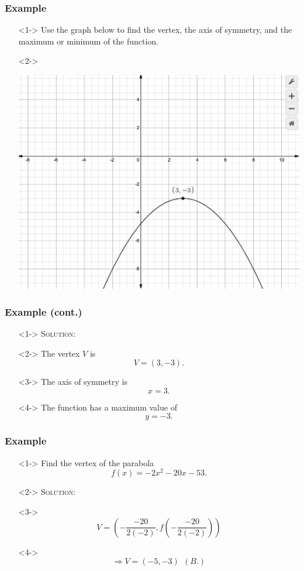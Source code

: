 \documentclass[handout]{beamer}
\begin{document}
\begin{frame}
	\frametitle{Example} 
	\begin{enumerate}
		\item[]<1-> Use the graph below to find the vertex, the axis of symmetry, and the maximum or minimum of the function. 
		\item[]<2-> 
			\begin{center}
				\includegraphics[scale=0.2]{3_3_10.png} 
			\end{center} 
	\end{enumerate}
\end{frame}

\begin{frame}
	\frametitle{Example (cont.)} 
	\begin{enumerate}
		\item[]<1-> \textsc{Solution:} 
		\item[]<2-> The vertex $V$ is 
			\[
				V=(3,-3). 
			\]
		\item[]<3-> The axis of symmetry is 
		\[
			x=3. 
		\]
		\item[]<4-> The function has a maximum value of 
		\[
			y=-3.  
		\]
	\end{enumerate}
\end{frame}

\begin{frame}
	\frametitle{Example}
	\begin{enumerate}
		\item[]<1-> Find the vertex of the parabola 
			\[
				f(x)=-2x^{2}-20x-53. 
			\]
		\item[]<2-> \textsc{Solution:} 
		\item[]<3-> \[ V= \left( -\frac{-20}{2(-2)}, f \left( -\frac{-20}{2(-2)}\right) \right) \] 
		\item[]<4-> \[ \Rightarrow V= (-5,-3) ~~(B.) \] 
	\end{enumerate}
\end{frame}
\end{document}
